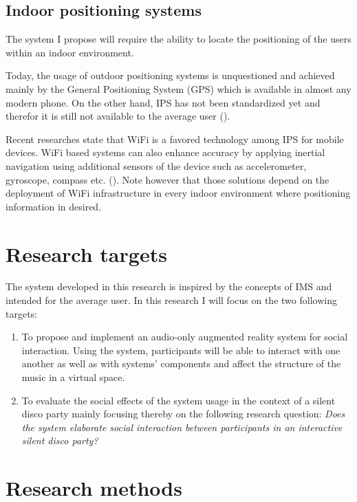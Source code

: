 \documentclass[a4paper,11pt]{article}
\begin{document}
\subsection{Indoor positioning systems}


The system I propose will require the ability to locate the positioning of the users within an indoor environment.

Today, the usage of outdoor positioning systems is unquestioned and achieved mainly by the General Positioning System (GPS) which is available in almost any modern phone.
On the other hand, IPS has not been standardized yet and therefor it is still not available to the average user (\cite{web:turetsky}).

Recent researches state that WiFi is a favored technology among IPS for mobile devices.
WiFi based systems can also enhance accuracy by applying inertial navigation using additional sensors of the device such as accelerometer, gyroscope, compass etc. (\cite{web:harrop}).
Note however that those solutions depend on the deployment of WiFi infrastructure in every indoor environment where positioning information in desired.

\section{Research targets}

The system developed in this research is inspired by the concepts of IMS and intended for the average user. In this research I will focus on the two following targets:
\begin{enumerate}
	\item To propose and implement an audio-only augmented reality system for social interaction.
	Using the system, participants will be able to interact with one another as well as with systems' components and affect the structure of the music in a virtual space.
	\item To evaluate the social effects of the system usage in the context of a silent disco party mainly focusing thereby on the following research question: \emph{Does the system elaborate social interaction between participants in an interactive silent disco party?}
\end{enumerate}

\section{Research methods}
\end{document}
